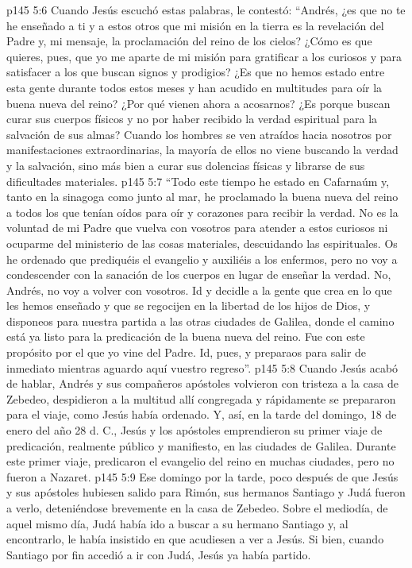 \vs p145 5:6 Cuando Jesús escuchó estas palabras, le contestó: “Andrés, ¿es que no te he enseñado a ti y a estos otros que mi misión en la tierra es la revelación del Padre y, mi mensaje, la proclamación del reino de los cielos? ¿Cómo es que quieres, pues, que yo me aparte de mi misión para gratificar a los curiosos y para satisfacer a los que buscan signos y prodigios? ¿Es que no hemos estado entre esta gente durante todos estos meses y han acudido en multitudes para oír la buena nueva del reino? ¿Por qué vienen ahora a acosarnos? ¿Es porque buscan curar sus cuerpos físicos y no por haber recibido la verdad espiritual para la salvación de sus almas? Cuando los hombres se ven atraídos hacia nosotros por manifestaciones extraordinarias, la mayoría de ellos no viene buscando la verdad y la salvación, sino más bien a curar sus dolencias físicas y librarse de sus dificultades materiales.
\vs p145 5:7 “Todo este tiempo he estado en Cafarnaúm y, tanto en la sinagoga como junto al mar, he proclamado la buena nueva del reino a todos los que tenían oídos para oír y corazones para recibir la verdad. No es la voluntad de mi Padre que vuelva con vosotros para atender a estos curiosos ni ocuparme del ministerio de las cosas materiales, descuidando las espirituales. Os he ordenado que prediquéis el evangelio y auxiliéis a los enfermos, pero no voy a condescender con la sanación de los cuerpos en lugar de enseñar la verdad. No, Andrés, no voy a volver con vosotros. Id y decidle a la gente que crea en lo que les hemos enseñado y que se regocijen en la libertad de los hijos de Dios, y disponeos para nuestra partida a las otras ciudades de Galilea, donde el camino está ya listo para la predicación de la buena nueva del reino. Fue con este propósito por el que yo vine del Padre. Id, pues, y preparaos para salir de inmediato mientras aguardo aquí vuestro regreso”.
\vs p145 5:8 Cuando Jesús acabó de hablar, Andrés y sus compañeros apóstoles volvieron con tristeza a la casa de Zebedeo, despidieron a la multitud allí congregada y rápidamente se prepararon para el viaje, como Jesús había ordenado. Y, así, en la tarde del domingo, 18 de enero del año 28 d. C., Jesús y los apóstoles emprendieron su primer viaje de predicación, realmente público y manifiesto, en las ciudades de Galilea. Durante este primer viaje, predicaron el evangelio del reino en muchas ciudades, pero no fueron a Nazaret.
\vs p145 5:9 Ese domingo por la tarde, poco después de que Jesús y sus apóstoles hubiesen salido para Rimón, sus hermanos Santiago y Judá fueron a verlo, deteniéndose brevemente en la casa de Zebedeo. Sobre el mediodía, de aquel mismo día, Judá había ido a buscar a su hermano Santiago y, al encontrarlo, le había insistido en que acudiesen a ver a Jesús. Si bien, cuando Santiago por fin accedió a ir con Judá, Jesús ya había partido.
